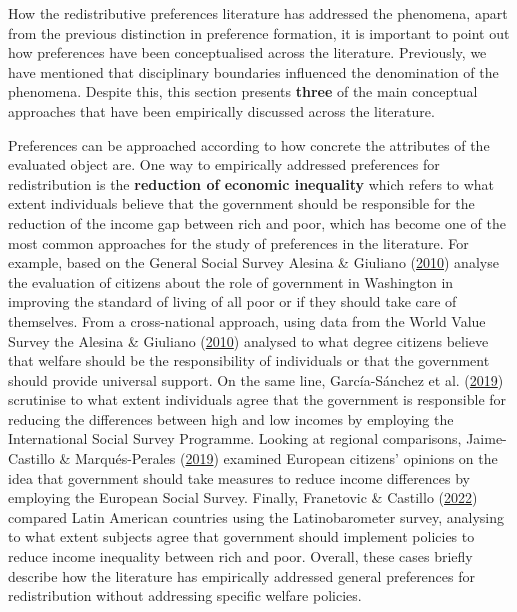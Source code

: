\documentclass[
  12pt,
]{book}
\begin{document}
How the redistributive preferences literature has addressed the phenomena, apart from the previous distinction in preference formation, it is important to point out how preferences have been conceptualised across the literature. Previously, we have mentioned that disciplinary boundaries influenced the denomination of the phenomena. Despite this, this section presents \textbf{three} of the main conceptual approaches that have been empirically discussed across the literature.

Preferences can be approached according to how concrete the attributes of the evaluated object are. One way to empirically addressed preferences for redistribution is the \textbf{reduction of economic inequality} which refers to what extent individuals believe that the government should be responsible for the reduction of the income gap between rich and poor, which has become one of the most common approaches for the study of preferences in the literature. For example, based on the General Social Survey Alesina \& Giuliano (\protect\hyperlink{ref-alesina_preferences_2010}{2010}) analyse the evaluation of citizens about the role of government in Washington in improving the standard of living of all poor or if they should take care of themselves. From a cross-national approach, using data from the World Value Survey the Alesina \& Giuliano (\protect\hyperlink{ref-alesina_preferences_2010}{2010}) analysed to what degree citizens believe that welfare should be the responsibility of individuals or that the government should provide universal support. On the same line, García-Sánchez et al. (\protect\hyperlink{ref-Garcia-Sanchez19}{2019}) scrutinise to what extent individuals agree that the government is responsible for reducing the differences between high and low incomes by employing the International Social Survey Programme. Looking at regional comparisons, Jaime-Castillo \& Marqués-Perales (\protect\hyperlink{ref-jaime-castillo_social_2019}{2019}) examined European citizens' opinions on the idea that government should take measures to reduce income differences by employing the European Social Survey. Finally, Franetovic \& Castillo (\protect\hyperlink{ref-franetovic_preferences_2022}{2022}) compared Latin American countries using the Latinobarometer survey, analysing to what extent subjects agree that government should implement policies to reduce income inequality between rich and poor. Overall, these cases briefly describe how the literature has empirically addressed general preferences for redistribution without addressing specific welfare policies.
\end{document}
